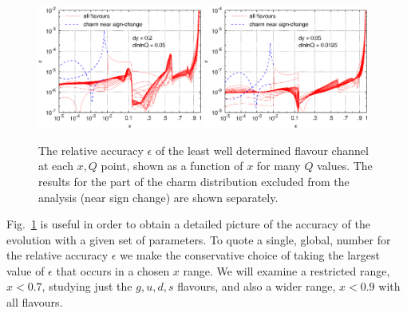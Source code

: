 \documentclass[12pt]{article}
\begin{document}
\begin{figure}
  \centering
  \includegraphics[width=0.48\textwidth]{../benchmarking/test_acc/acc-dy0.2-dlnlnQ0.05.eps}\hfill
  \includegraphics[width=0.48\textwidth]{../benchmarking/test_acc/acc-dy0.05-dlnlnQ0.0125.eps}
  \caption{The relative accuracy $\epsilon$ of the least well
    determined flavour channel at each $x, Q$ point, shown as a
    function of $x$ for many $Q$ values. The results for the part of
    the charm distribution excluded from the analysis (near sign
    change) are shown separately. }
  \label{fig:acc-fixed-dy-dlnlnQ}
\end{figure}

Fig.~\ref{fig:acc-fixed-dy-dlnlnQ} is useful in order to obtain a
detailed picture of the accuracy of the evolution with a given set of
parameters. To quote a single, global, number for the relative 
accuracy $\epsilon$ we make
the conservative choice of taking the largest value of $\epsilon$ that
occurs in a chosen $x$ range. We will examine a restricted range,
$x<0.7$, studying just the $g,u,d,s$ flavours, and also a wider range,
$x<0.9$ with all flavours.
\end{document}
